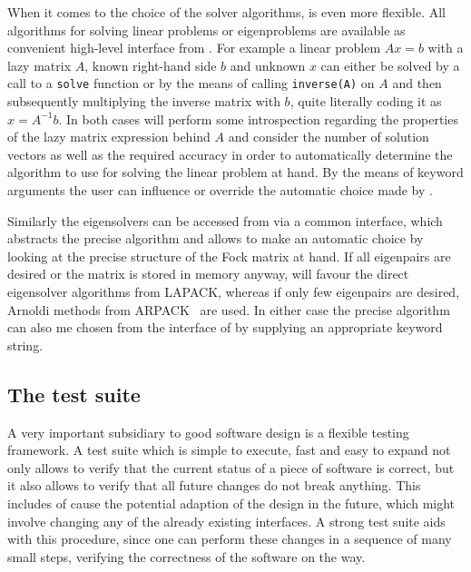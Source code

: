 When it comes to the choice of the solver algorithms, \lazyten is even more flexible.
All algorithms for solving linear problems or eigenproblems are available as 
convenient high-level interface from \gscf.
For example a linear problem $A x = b$ with a lazy matrix $A$, known right-hand side $b$
and unknown $x$ can either be solved by a call to a \texttt{solve} function or by
the means of calling \texttt{inverse(A)} on $A$ and then subsequently
multiplying the inverse matrix with $b$, quite literally coding it as $x = A^{-1} b$.
In both cases \lazyten will perform some introspection regarding the properties of
the lazy matrix expression behind $A$ and consider the number of solution
vectors as well as the required accuracy in order to automatically determine the algorithm to use
for solving the linear problem at hand.
By the means of keyword arguments the user can influence or override the automatic
choice made by \lazyten.

Similarly the eigensolvers can be accessed from \gscf via a common interface,
which abstracts the precise algorithm and allows \lazyten to make an automatic
choice by looking at the precise structure of the Fock matrix at hand.
If all eigenpairs are desired or the matrix is stored in memory anyway,
\lazyten will favour the direct eigensolver algorithms from LAPACK,
whereas if only few eigenpairs are desired,
Arnoldi methods from ARPACK~\cite{Lehoucq1998} are used.
In either case the precise algorithm can also me chosen from the \python interface
of \molsturm by supplying an appropriate keyword string.


%
%
\subsection{The \molsturm test suite}
A very important subsidiary to good software design is a flexible testing framework.
A test suite which is simple to execute, fast and easy to expand not only allows to verify
that the current status of a piece of software is correct,
but it also allows to verify that all future changes do not break anything.
This includes of cause the potential adaption of the design in the future,
which might involve changing any of the already existing interfaces.
A strong test suite aids with this procedure,
since one can perform these changes in a sequence of many small steps,
verifying the correctness of the software on the way.

